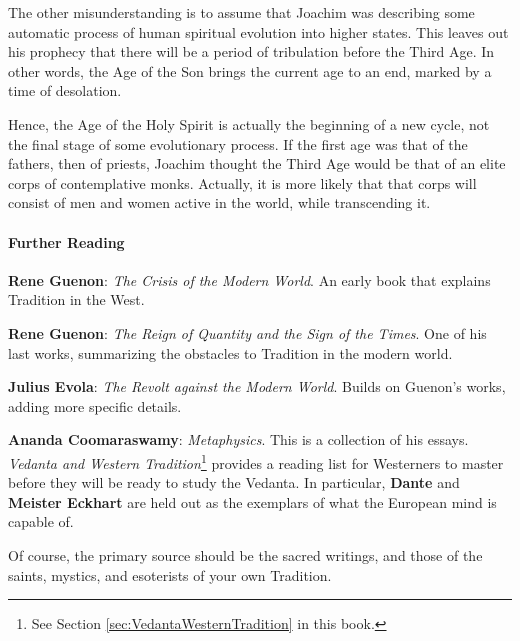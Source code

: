 The other misunderstanding is to assume that Joachim was describing some automatic process of human spiritual evolution into higher states. This leaves out his prophecy that there will be a period of tribulation before the Third Age. In other words, the Age of the Son brings the current age to an end, marked by a time of desolation.

Hence, the Age of the Holy Spirit is actually the beginning of a new cycle, not the final stage of some evolutionary process. If the first age was that of the fathers, then of priests, Joachim thought the Third Age would be that of an elite corps of contemplative monks. Actually, it is more likely that that corps will consist of men and women active in the world, while transcending it.

\paragraph{Further Reading}
\textbf{Rene Guenon}: \emph{The Crisis of the Modern World}. An early book that explains Tradition in the West.

\textbf{Rene Guenon}: \emph{The Reign of Quantity and the Sign of the Times}. One of his last works, summarizing the obstacles to Tradition in the modern world.

\textbf{Julius Evola}: \emph{The Revolt against the Modern World}. Builds on Guenon's works, adding more specific details.

\textbf{Ananda Coomaraswamy}: \emph{Metaphysics}. This is a collection of his essays. \textit{Vedanta and Western Tradition}\footnote{See Section \ref{sec:VedantaWesternTradition} in this book.} provides a reading list for Westerners to master before they will be ready to study the Vedanta. In particular, \textbf{Dante} and \textbf{Meister Eckhart} are held out as the exemplars of what the European mind is capable of.

Of course, the primary source should be the sacred writings, and those of the saints, mystics, and esoterists of your own Tradition.

